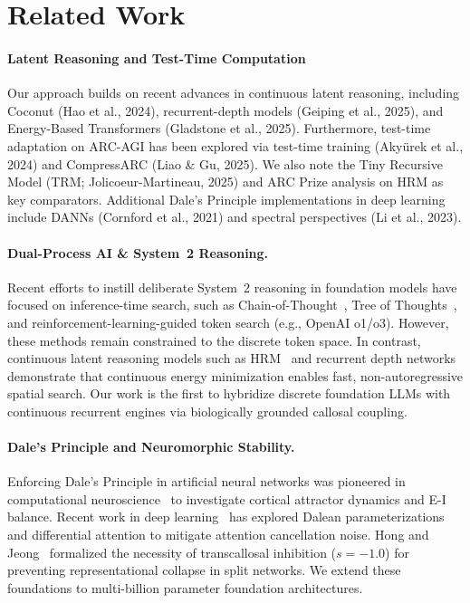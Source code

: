 \documentclass[11pt,a4paper]{article}
\theoremstyle{plain}
\theoremstyle{definition}
\theoremstyle{remark}
\begin{document}
\section{Related Work}

\paragraph{Latent Reasoning and Test-Time Computation}  
Our approach builds on recent advances in continuous latent reasoning, including Coconut (Hao et al., 2024), recurrent-depth models (Geiping et al., 2025), and Energy-Based Transformers (Gladstone et al., 2025). Furthermore, test-time adaptation on ARC-AGI has been explored via test-time training (Akyürek et al., 2024) and CompressARC (Liao \& Gu, 2025). We also note the Tiny Recursive Model (TRM; Jolicoeur-Martineau, 2025) and ARC Prize analysis on HRM as key comparators. Additional Dale's Principle implementations in deep learning include DANNs (Cornford et al., 2021) and spectral perspectives (Li et al., 2023).
\label{sec:related_work}

\paragraph{Dual-Process AI \& System~2 Reasoning.} 
Recent efforts to instill deliberate System~2 reasoning in foundation models have focused on inference-time search, such as Chain-of-Thought~\cite{wei2022chain}, Tree of Thoughts~\cite{yao2024tree}, and reinforcement-learning-guided token search (e.g., OpenAI o1/o3). However, these methods remain constrained to the discrete token space. In contrast, continuous latent reasoning models such as HRM~\cite{wang2025hrm} and recurrent depth networks demonstrate that continuous energy minimization enables fast, non-autoregressive spatial search. Our work is the first to hybridize discrete foundation LLMs with continuous recurrent engines via biologically grounded callosal coupling.

\paragraph{Dale's Principle and Neuromorphic Stability.}
Enforcing Dale's Principle in artificial neural networks was pioneered in computational neuroscience~\cite{eccles1954dale,rajan2006eigenvalue,murphy2009balanced} to investigate cortical attractor dynamics and E-I balance. Recent work in deep learning~\cite{song2023dale,ye2025differential} has explored Dalean parameterizations and differential attention to mitigate attention cancellation noise. Hong and Jeong~\cite{jeong2026lateralization} formalized the necessity of transcallosal inhibition ($s = -1.0$) for preventing representational collapse in split networks. We extend these foundations to multi-billion parameter foundation architectures.
\end{document}
